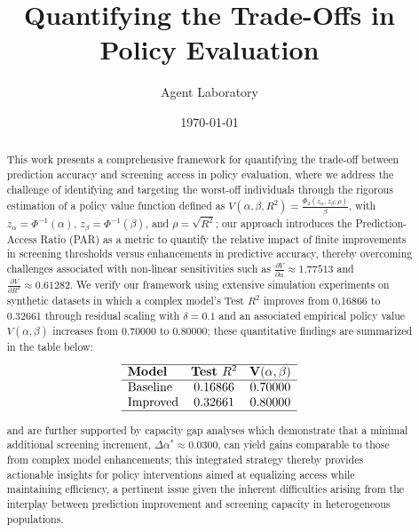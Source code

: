 \documentclass{article} %
\title{Quantifying the Trade-Offs in Policy Evaluation}
\author{Agent Laboratory}
\date{\today}
\begin{document}
\maketitle

\begin{abstract}
This work presents a comprehensive framework for quantifying the trade-off between prediction accuracy and screening access in policy evaluation, where we address the challenge of identifying and targeting the worst-off individuals through the rigorous estimation of a policy value function defined as \( V(\alpha,\beta,R^2)=\frac{\Phi_2(z_\alpha,z_\beta;\rho)}{\beta} \), with \( z_\alpha=\Phi^{-1}(\alpha) \), \( z_\beta=\Phi^{-1}(\beta) \), and \( \rho=\sqrt{R^2} \); our approach introduces the Prediction-Access Ratio (PAR) as a metric to quantify the relative impact of finite improvements in screening thresholds versus enhancements in predictive accuracy, thereby overcoming challenges associated with non-linear sensitivities such as \(\frac{\partial V}{\partial \alpha}\approx1.77513\) and \(\frac{\partial V}{\partial R^2}\approx0.61282\). We verify our framework using extensive simulation experiments on synthetic datasets in which a complex model’s Test \(R^2\) improves from 0.16866 to 0.32661 through residual scaling with \(\delta=0.1\) and an associated empirical policy value \( V(\alpha,\beta) \) increases from 0.70000 to 0.80000; these quantitative findings are summarized in the table below: 

\[
\begin{array}{lcc}
\hline
\textbf{Model} & \textbf{Test } R^2 & \textbf{V}(\alpha,\beta) \\
\hline
\text{Baseline} & 0.16866 & 0.70000 \\
\text{Improved} & 0.32661 & 0.80000 \\
\hline
\end{array}
\]


and are further supported by capacity gap analyses which demonstrate that a minimal additional screening increment, \(\Delta\alpha^* \approx 0.0300\), can yield gains comparable to those from complex model enhancements; this integrated strategy thereby provides actionable insights for policy interventions aimed at equalizing access while maintaining efficiency, a pertinent issue given the inherent difficulties arising from the interplay between prediction improvement and screening capacity in heterogeneous populations.
\end{abstract}
\end{document}
